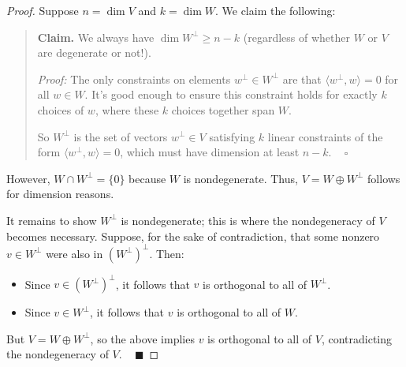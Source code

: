\begin{proof}
    Suppose $n = \dim V$ and $k = \dim W$.  We claim the following:
    \begin{quote}
        \textbf{Claim.} We always have $\dim W^{\perp} \geq n - k$ (regardless of whether $W$ or $V$ are degenerate or not!).
        
        \emph{Proof:} The only constraints on elements $w^{\perp} \in W^{\perp}$ are that $\langle w^{\perp}, w \rangle = 0$ for all $w \in W$.  It's good enough to ensure this constraint holds for exactly $k$ choices of $w$, where these $k$ choices together span $W$.

        So $W^{\perp}$ is the set of vectors $w^{\perp} \in V$ satisfying $k$ linear constraints of the form $\langle w^{\perp}, w \rangle = 0$, which must have dimension at least $n - k$. ~ $\square$
    \end{quote}
    However, $W \cap W^{\perp} = \{0\}$ because $W$ is nondegenerate.  Thus, $V = W \oplus W^{\perp}$ follows for dimension reasons.

    It remains to show $W^{\perp}$ is nondegenerate; this is where the nondegeneracy of $V$ becomes necessary.  Suppose, for the sake of contradiction, that some nonzero $v \in W^{\perp}$ were also in $(W^{\perp})^{\perp}$.  Then:
    \begin{itemize}
        \item Since $v \in (W^{\perp})^{\perp}$, it follows that $v$ is orthogonal to all of $W^{\perp}$.
        \item Since $v \in W^{\perp}$, it follows that $v$ is orthogonal to all of $W$.
    \end{itemize}
    But $V = W \oplus W^{\perp}$, so the above implies $v$ is orthogonal to all of $V$, contradicting the nondegeneracy of $V$. ~ $\blacksquare$
        

\end{proof}
